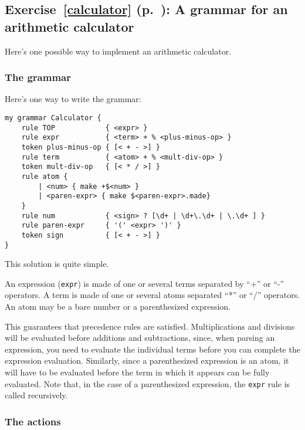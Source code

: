 \subsection{Exercise~\ref{calculator} (p.~\pageref{calculator}): 
A grammar for an arithmetic calculator}
\label{sol_calculator}

Here's one possible way to implement an arithmetic calculator.

\subsubsection{The grammar}

Here's one way to write the grammar:

\begin{verbatim}
my grammar Calculator {
    rule TOP            { <expr> }
    rule expr           { <term> + % <plus-minus-op> }
    token plus-minus-op { [< + - >] }
    rule term           { <atom> + % <mult-div-op> }
    token mult-div-op   { [< * / >] }
    rule atom {
        | <num> { make +$<num> }
        | <paren-expr> { make $<paren-expr>.made}
    }
    rule num            { <sign> ? [\d+ | \d+\.\d+ | \.\d+ ] }
    rule paren-expr     { '(' <expr> ')' }
    token sign          { [< + - >] }
}
\end{verbatim}

This solution is quite simple.

An expression (\verb'expr') is made of one or several terms 
separated by ``+'' or ``-'' operators. A term is made of one 
or several atoms separated ``*'' or ``/'' operators. An atom 
may be a bare number or a parenthesized expression.

This guarantees that precedence rules are satisfied. 
Multiplications and divisions will be 
evaluated before additions and subtractions, since, when 
parsing an expression, you need to evaluate the individual 
terms before you can complete the expression evaluation. 
Similarly, since a parenthesized expression is an atom, it 
will have to be evaluated before the term in which it 
appears can be fully evaluated. Note that, in the case 
of a parenthesized expression, the \verb'expr' rule 
is called recursively.

\subsubsection{The actions}

